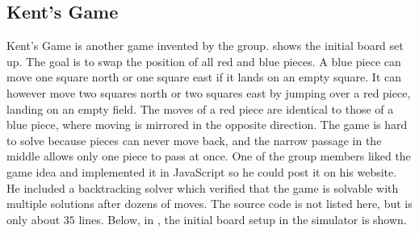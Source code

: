 
\subsection{Kent's Game}
Kent's Game is another game invented by the group.
 shows the initial board set up. The
goal is to swap the position of all red and blue pieces. A blue piece
can move one square north or one square east if it lands on an empty
square. It can however move two squares north or two squares east by
jumping over a red piece, landing on an empty field. The moves of a
red piece are identical to those of a blue piece, where moving is
mirrored in the opposite direction. The game is hard to solve because
pieces can never move back, and the narrow passage in the middle allows
only one piece to pass at once. One of the group members liked the
game idea and implemented it in JavaScript so he could post it on his
website. He included a backtracking solver which verified that the
game is solvable with multiple solutions after dozens of moves. The
source code is not listed here, but is only about $35$ lines. Below, in
, the initial board setup in the simulator
is shown.

